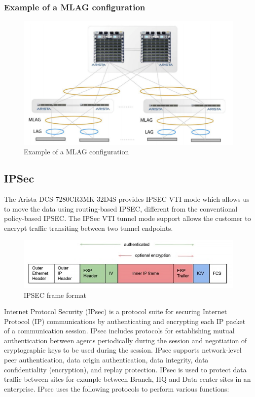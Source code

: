 \subsubsection{Example of a MLAG configuration}
\begin{figure}
    \includegraphics[width=16cm]{images/mlag.png}
    \centering
    \caption{Example of a MLAG configuration}
  \end{figure}

\subsection{IPSec}

The Arista DCS-7280CR3MK-32D4S provides IPSEC VTI mode which allows us to move the data using routing-based IPSEC, different from the conventional policy-based IPSEC.
The IPSec VTI tunnel mode support allows the customer to encrypt traffic transiting between two tunnel endpoints.

\begin{figure}
    \includegraphics[width=16cm]{images/IPSEC_format.png}
    \centering
    \caption{IPSEC frame format}
  \end{figure}

\newpage

Internet Protocol Security (IPsec) is a protocol suite for securing Internet Protocol (IP) communications by authenticating and encrypting each IP packet of a communication session. IPsec includes protocols for establishing mutual authentication between agents periodically during the session and negotiation of cryptographic keys to be used during the session. IPsec supports network-level peer authentication, data origin authentication, data integrity, data confidentiality (encryption), and replay protection.
IPsec is used to protect data traffic between sites for example between Branch, HQ and Data center sites in an enterprise.
IPsec uses the following protocols to perform various functions:

